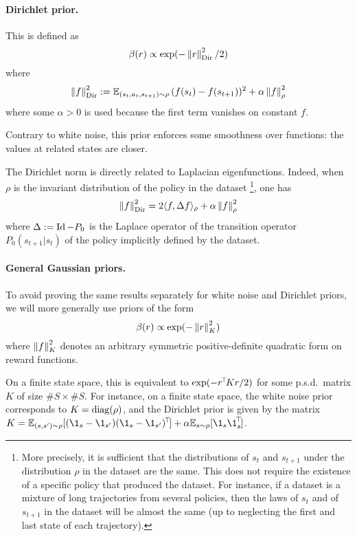 \documentclass[11pt,a4paper]{article}
\newcommand{\Dir}{_\mathrm{Dir}}
\begin{document}
\paragraph{Dirichlet prior.} 
This is defined as 
\begin{equation}
\beta(r)\propto
\exp(-\norm{r}^2\Dir/2)
\end{equation}
where
\begin{equation}
\norm{f}\Dir^2\deq \E_{(s_t,a_t,s_{t+1})\sim \rho}\,
(f(s_t)-f(s_{t+1}))^2+\alpha \norm{f}^2_\rho
\end{equation}
where some $\alpha>0$ is used because the first term vanishes on constant $f$.

Contrary to white noise, this prior enforces some smoothness over
functions: the values at related states are closer.

The Dirichlet norm is directly related to Laplacian eigenfunctions.
Indeed, when $\rho$ is the invariant distribution of the policy in the dataset
\footnote{
More precisely, it is sufficient that the distributions of $s_t$ and $s_{t+1}$ under
the distribution $\rho$ in the dataset are the same. This does not
require the existence of a specific policy that produced the dataset. For
instance, if a dataset is a mixture of long trajectories from several
policies, then the laws of $s_t$ and of $s_{t+1}$ in the dataset will be
almost the same (up to neglecting the first and last state of each trajectory).}, one has
\begin{equation}
\norm{f}\Dir^2=2\langle f,\Delta f\rangle_\rho + \alpha \norm{f}^2_\rho
\end{equation}
where $\Delta \mathrel{\mathop{:}}= \operatorname{Id} - P_0$ is the Laplace operator of the
transition operator $P_0(s_{t+1}|s_t)$ of the policy implicitly defined
by the dataset.

\paragraph{General Gaussian priors.} To avoid proving the same results
separately for white noise and Dirichlet priors, we will more generally
use priors of the form
\begin{equation}
\beta(r)\propto \exp(-\left\lVert r\right\rVert^2_K)
\end{equation}
where $\left\lVert f\right\rVert^2_K$ denotes an arbitrary symmetric positive-definite
quadratic form on reward functions.

On a finite state space, this is equivalent
to $\exp(-r^{\!\top}\!Kr/2)$ for some p.s.d.\ matrix $K$ of size $\#S\times
\#S$. For instance, on
a finite state space, the white noise prior corresponds to
$K=\operatorname{diag}(\rho)$, and the Dirichlet prior is given by the matrix
$K=\E_{(s,s')\sim \rho}
[(\1_s-\1_{s'})\transp{(\1_s-\1_{s'})}]+\alpha \E_{s\sim \rho}[
\1_s\transp{\1_s}]$.
\end{document}
